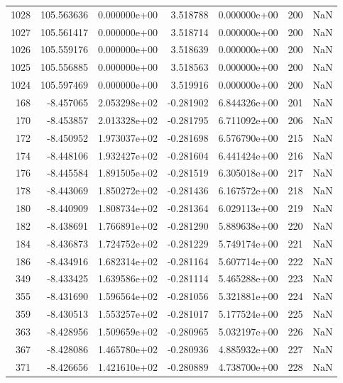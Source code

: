 \begin{tabular}{rrrrrrr}
1028 & 105.563636 &  0.000000e+00 &  3.518788 &  0.000000e+00 &         200 & NaN \\
1027 & 105.561417 &  0.000000e+00 &  3.518714 &  0.000000e+00 &         200 & NaN \\
1026 & 105.559176 &  0.000000e+00 &  3.518639 &  0.000000e+00 &         200 & NaN \\
1025 & 105.556885 &  0.000000e+00 &  3.518563 &  0.000000e+00 &         200 & NaN \\
1024 & 105.597469 &  0.000000e+00 &  3.519916 &  0.000000e+00 &         200 & NaN \\
 168 &  -8.457065 &  2.053298e+02 & -0.281902 &  6.844326e+00 &         201 & NaN \\
 170 &  -8.453857 &  2.013328e+02 & -0.281795 &  6.711092e+00 &         206 & NaN \\
 172 &  -8.450952 &  1.973037e+02 & -0.281698 &  6.576790e+00 &         215 & NaN \\
 174 &  -8.448106 &  1.932427e+02 & -0.281604 &  6.441424e+00 &         216 & NaN \\
 176 &  -8.445584 &  1.891505e+02 & -0.281519 &  6.305018e+00 &         217 & NaN \\
 178 &  -8.443069 &  1.850272e+02 & -0.281436 &  6.167572e+00 &         218 & NaN \\
 180 &  -8.440909 &  1.808734e+02 & -0.281364 &  6.029113e+00 &         219 & NaN \\
 182 &  -8.438691 &  1.766891e+02 & -0.281290 &  5.889638e+00 &         220 & NaN \\
 184 &  -8.436873 &  1.724752e+02 & -0.281229 &  5.749174e+00 &         221 & NaN \\
 186 &  -8.434916 &  1.682314e+02 & -0.281164 &  5.607714e+00 &         222 & NaN \\
 349 &  -8.433425 &  1.639586e+02 & -0.281114 &  5.465288e+00 &         223 & NaN \\
 355 &  -8.431690 &  1.596564e+02 & -0.281056 &  5.321881e+00 &         224 & NaN \\
 359 &  -8.430513 &  1.553257e+02 & -0.281017 &  5.177524e+00 &         225 & NaN \\
 363 &  -8.428956 &  1.509659e+02 & -0.280965 &  5.032197e+00 &         226 & NaN \\
 367 &  -8.428086 &  1.465780e+02 & -0.280936 &  4.885932e+00 &         227 & NaN \\
 371 &  -8.426656 &  1.421610e+02 & -0.280889 &  4.738700e+00 &         228 & NaN \\

\end{tabular}
